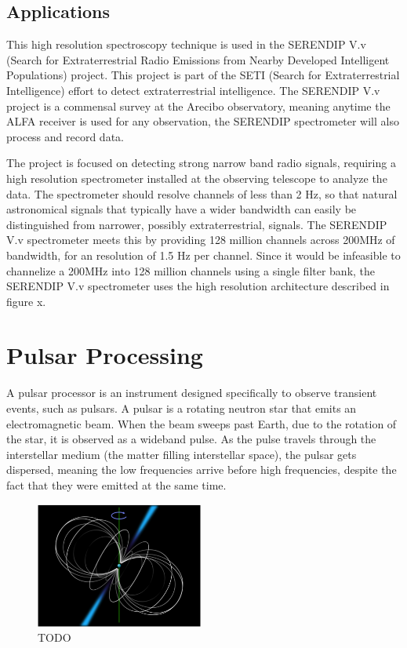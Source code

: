 \subsection{Applications}

This high resolution spectroscopy technique is used in the SERENDIP V.v (Search for Extraterrestrial Radio Emissions from Nearby Developed Intelligent Populations) project. 
This project is part of the SETI (Search for Extraterrestrial Intelligence) effort to detect extraterrestrial intelligence. 
The SERENDIP V.v project is a commensal survey at the Arecibo observatory, meaning anytime the ALFA receiver is used for any observation, the SERENDIP spectrometer will also process and record data. %

The project is focused on detecting strong narrow band radio signals, requiring a high resolution spectrometer installed at the observing telescope to analyze the data. 
The spectrometer should resolve channels of less than 2 Hz, so that natural astronomical signals that typically have a wider bandwidth can easily be distinguished from narrower, possibly extraterrestrial, signals. 
The SERENDIP V.v spectrometer meets this by providing 128 million channels across 200MHz of bandwidth, for an resolution of 1.5 Hz per channel. 
Since it would be infeasible to channelize a 200MHz into 128 million channels using a single filter bank, the SERENDIP V.v spectrometer uses the high resolution architecture described in figure x. %






\section{Pulsar Processing}
\label{Real Time Radio Astronomy Algorithms:Pulsar Processing}
A pulsar processor is an instrument designed specifically to observe transient events, such as pulsars. 
A pulsar is a rotating neutron star that emits an electromagnetic beam. 
When the beam sweeps past Earth, due to the rotation of the star, it is observed as a wideband pulse. 
As the pulse travels through the interstellar medium (the matter filling interstellar space), the pulsar gets dispersed, meaning the low frequencies arrive before high frequencies, despite the fact that they were emitted at the same time. 

\begin{figure}
  \centering
    \includegraphics[width=0.49\textwidth]{Images/C2/pulsar.png}
  \caption{TODO}
  \label{fig: C2/pulsar.png}
\end{figure}

